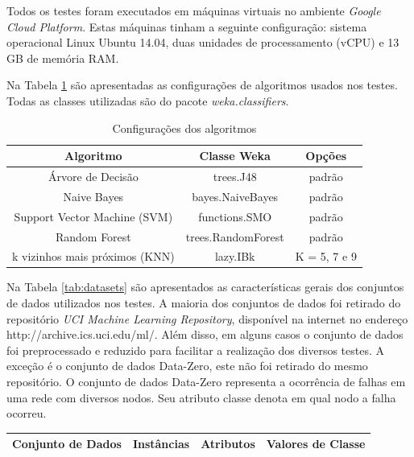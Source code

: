 {Todos os testes foram executados em máquinas virtuais no ambiente \textit{Google Cloud Platform}. 
Estas máquinas tinham a seguinte configuração: sistema operacional Linux Ubuntu 14.04, duas unidades de processamento (vCPU) e 13 GB de memória RAM.

Na Tabela \ref{tab:algoritmostestes} são apresentadas as configurações de algoritmos usados nos testes. Todas as classes utilizadas são do pacote \textit{weka.classifiers}.

\begin{table}[h!]
  \begin{center}
    \begin{tabular}{ccc}
      \hline
      \textbf{Algoritmo} & \textbf{Classe Weka} & \textbf{Opções} \\
      \hline

      Árvore de Decisão & trees.J48 & padrão \\
      Naive Bayes & bayes.NaiveBayes & padrão \\
      Support Vector Machine (SVM) & functions.SMO & padrão \\
      Random Forest & trees.RandomForest & padrão \\
      k vizinhos mais próximos (KNN) & lazy.IBk & K = 5, 7 e 9 \\

      \hline
    \end{tabular}
    \caption{Configurações dos algoritmos}
    \label{tab:algoritmostestes}
  \end{center}
\end{table}

Na Tabela \ref{tab:datasets} são apresentados as características gerais dos conjuntos de dados utilizados nos testes.
A maioria dos conjuntos de dados foi retirado do repositório \textit{UCI Machine Learning Repository}, disponível na internet no endereço http://archive.ics.uci.edu/ml/.
Além disso, em alguns casos o conjunto de dados foi preprocessado e reduzido para facilitar a realização dos diversos testes.
A exceção é o conjunto de dados Data-Zero, este não foi retirado do mesmo repositório.
O conjunto de dados Data-Zero representa a ocorrência de falhas em uma rede com diversos nodos.
Seu atributo classe denota em qual nodo a falha ocorreu.

\begin{table}[h!]
  \begin{center}
    \begin{tabular}{cccc}
      \hline
      \textbf{Conjunto de Dados} & \textbf{Instâncias} & \textbf{Atributos} & \textbf{Valores de Classe} \\
      \hline


\end{tabular}
\end{center}
\end{table}}
